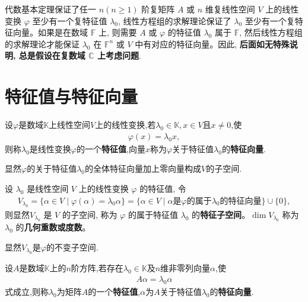 \documentclass[lang=cn,newtx,10pt,scheme=chinese]{elegantbook}
\begin{document}
\begin{remark}
代数基本定理保证了任一 $n(n \geq 1)$ 阶复矩阵 $A$ 或 $n$ 维复线性空间 $V$ 上的线性变换 $\varphi$ 至少有一个复特征值 $\lambda_0$, 线性方程组的求解理论保证了 $\lambda_0$ 至少有一个复特征向量。如果是在数域 $\mathbb{F}$ 上, 则需要 $A$ 或 $\varphi$ 的特征值 $\lambda_0$ 属于 $\mathbb{F}$, 然后线性方程组的求解理论才能保证 $\lambda_0$ 在 $\mathbb{F}^n$ 或 $V$ 中有对应的特征向量。因此, \textbf{后面如无特殊说明, 总是假设在复数域 $\mathbb{C}$ 上考虑问题}.
\end{remark}

\section{特征值与特征向量}

\begin{definition}[线性变换的特征值和特征向量]
设$\varphi$是数域$\mathbb{K}$上线性空间$V$上的线性变换,若$\lambda_0 \in \mathbb{K}, x \in V$且$x \neq 0$,使
\begin{align*}
\varphi(x) = \lambda_0 x,
\end{align*}
则称$\lambda_0$是线性变换$\varphi$的一个\textbf{特征值},向量$x$称为$\varphi$关于特征值$\lambda_0$的\textbf{特征向量}.
\end{definition}
\begin{note}
显然$\varphi$的关于特征值$\lambda_0$的全体特征向量加上零向量构成$V$的子空间.
\end{note}

\begin{definition}[线性变换的特征子空间与几何重数]
设 $\lambda_0$ 是线性空间 $V$ 上的线性变换 $\varphi$ 的特征值, 令
\begin{align*}
V_{\lambda_0} = \{\alpha \in V \mid \varphi(\alpha) = \lambda_0 \alpha\} 
= \{\alpha \in V \mid \alpha \text{是} \varphi \text{的属于} \lambda_0 \text{的特征向量}\} \cup \{0\},
\end{align*}
则显然$V_{\lambda_0}$ 是 $V$ 的子空间, 称为 $\varphi$ 的属于特征值 $\lambda_0$ 的\textbf{特征子空间}。$\dim V_{\lambda_0}$ 称为 $\lambda_0$ 的\textbf{几何重数或度数}。
\end{definition}
\begin{note}
显然$V_{\lambda_0}$是$\varphi$的不变子空间.
\end{note}

\begin{definition}[矩阵的特征值和特征向量]
设$A$是数域$\mathbb{K}$上的$n$阶方阵,若存在$\lambda_0 \in \mathbb{K}$及$n$维非零列向量$\alpha$,使
\begin{align*}
A \alpha = \lambda_0 \alpha
\end{align*}
式成立,则称$\lambda_0$为矩阵$A$的一个\textbf{特征值},$\alpha$为$A$关于特征值$\lambda_0$的\textbf{特征向量}.
\end{definition}
\end{document}
